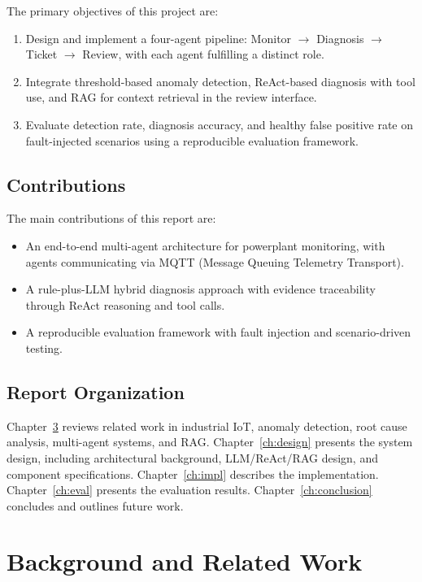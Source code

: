 \documentclass[12pt,letterpaper]{report}
\begin{document}
The primary objectives of this project are:

\begin{enumerate}
\item Design and implement a four-agent pipeline: Monitor $\rightarrow$ Diagnosis $\rightarrow$ Ticket $\rightarrow$ Review, with each agent fulfilling a distinct role.
\item Integrate threshold-based anomaly detection, ReAct-based diagnosis with tool use, and RAG for context retrieval in the review interface.
\item Evaluate detection rate, diagnosis accuracy, and healthy false positive rate on fault-injected scenarios using a reproducible evaluation framework.
\end{enumerate}

\section{Contributions}

The main contributions of this report are:

\begin{itemize}
\item An end-to-end multi-agent architecture for powerplant monitoring, with agents communicating via MQTT (Message Queuing Telemetry Transport).
\item A rule-plus-LLM hybrid diagnosis approach with evidence traceability through ReAct reasoning and tool calls.
\item A reproducible evaluation framework with fault injection and scenario-driven testing.
\end{itemize}

\section{Report Organization}

Chapter~\ref{ch:background} reviews related work in industrial IoT, anomaly detection, root cause analysis, multi-agent systems, and RAG. Chapter~\ref{ch:design} presents the system design, including architectural background, LLM/ReAct/RAG design, and component specifications. Chapter~\ref{ch:impl} describes the implementation. Chapter~\ref{ch:eval} presents the evaluation results. Chapter~\ref{ch:conclusion} concludes and outlines future work.

\chapter{Background and Related Work}
\label{ch:background}
\end{document}
